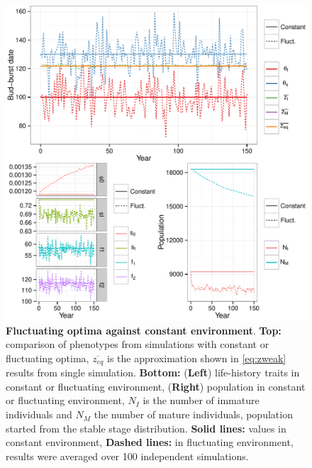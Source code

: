 \documentclass[a4paper, 12pt]{article}
\begin{document}
\begin{figure}[ht!]
	\centering
	\includegraphics[scale=1]{Figures/PhenoLHTwithCorr.pdf}
	\caption{\textbf{Fluctuating optima against constant environment}. \textbf{Top:} comparison of phenotypes from simulations with constant or fluctuating optima, $\overline{z_{eq}}$ is the approximation shown in \autoref{eq:zweak} results from single simulation. \textbf{Bottom:} (\textbf{Left}) life-history traits in constant or fluctuating environment, (\textbf{Right}) population in constant or fluctuating environment, $N_I$ is the number of immature individuals and $N_M$ the number of mature individuals, population started from the stable stage distribution. \textbf{Solid lines:} values in constant environment, \textbf{Dashed lines:} in fluctuating environment, results were averaged over 100 independent simulations.}
	\label{fig:corr}
\end{figure}
\end{document}
